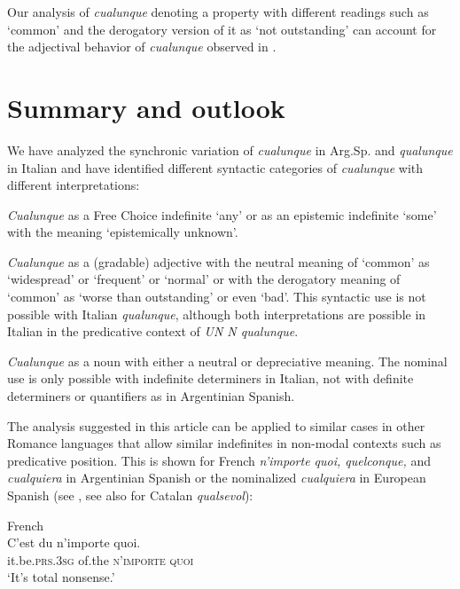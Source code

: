 \documentclass[output=paper,colorlinks,citecolor=brown]{langscibook}
\begin{document}
Our analysis of \textit{cualunque} denoting a property with different readings such as ‘common’ and the derogatory version of it as ‘not outstanding’ can account for the adjectival behavior of \textit{cualunque} observed in  .

\section{Summary and outlook}\label{sec:fk7}

We have analyzed the synchronic variation of \textit{cualunque} in Arg.Sp. and \textit{qualunque} in Italian and have identified different syntactic categories of \textit{cualunque} with different interpretations:

\begin{description}
\item \textit{Cualunque} as a Free Choice indefinite ‘any’ or as an epistemic indefinite ‘some’ with the meaning ‘epistemically unknown’.
\item \textit{Cualunque} as a (gradable) adjective with the neutral meaning of ‘common’ as ‘widespread’ or ‘frequent’ or ‘normal’ or with the derogatory meaning of ‘common’ as ‘worse than outstanding’ or even ‘bad’. This syntactic use is not possible with Italian \textit{qualunque}, although both interpretations are possible in Italian in the predicative context of \textit{UN N qualunque}.
\item \textit{Cualunque} as a noun with either a neutral or depreciative meaning. The nominal use is only possible with indefinite determiners in Italian, not with definite determiners or quantifiers as in Argentinian Spanish.
\end{description}

The analysis suggested in this article can be applied to similar cases in other Romance languages that allow similar indefinites in non-modal contexts such as predicative position. This is shown for French \textit{n’importe quoi, quelconque,} and \textit{cualquiera} in Argentinian Spanish or the nominalized \textit{cualquiera} in European Spanish (see \cite{Kellert2021c}, see also  for Catalan \textit{qualsevol}):

\ea \label{ex:fk73}
    French\\
    \gll C’est du n’importe quoi.\\
    it.be.\textsc{prs.3sg} of.the \textsc{n'importe} \textsc{quoi}\\ 
    \glt ‘It’s total nonsense.’\\
    
\end{document}

